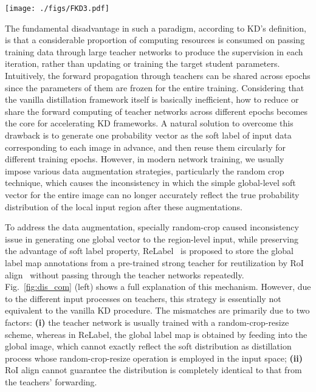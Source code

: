 \documentclass[10pt,twocolumn,letterpaper]{article}
\begin{document}
\begin{figure*}[t]
  \centering
  \texttt{[image: ./figs/FKD3.pdf]}
  \vspace{-0.12in}
  \caption{Comparison of ReLabel~\cite{yun2021re} and our fast knowledge distillation (FKD) framework.} 
  \label{fig:dis_com}
  \vspace{-0.13in}
\end{figure*}

The fundamental disadvantage in such a paradigm, according to KD's definition, is that a considerable proportion of computing resources is consumed on passing training data through large teacher networks to produce the supervision  in each iteration, rather than updating or training the target student parameters. Intuitively, the forward propagation through teachers can be shared across epochs since the parameters of them are frozen for the entire training. Considering that the vanilla distillation framework itself is basically inefficient, how to reduce or share the forward computing of teacher networks across different epochs becomes the core for accelerating  KD frameworks. 
A natural solution to overcome this drawback is to generate one probability vector as the soft label of input data corresponding to each image in advance, and then reuse them circularly for different training epochs. However, in modern network training, we usually impose various data augmentation strategies, particularly the random crop technique, which causes the inconsistency in which the simple global-level soft vector for the entire image can no longer  accurately reflect the true probability distribution of the local input region after these augmentations.

To address the data augmentation, specially random-crop caused inconsistency issue in generating one global vector to the region-level input, while preserving the advantage of soft label property, ReLabel~\cite{yun2021re} is proposed to store the global label map annotations from a pre-trained strong teacher for reutilization by RoI align~\cite{he2017mask} without passing through the teacher networks repeatedly. Fig.~\ref{fig:dis_com} (left) shows a full explanation of this mechanism. However, due to the different input processes on teachers, this strategy is essentially not equivalent to the vanilla KD procedure. The mismatches are primarily due to two factors: {\bf(i)} the teacher network is usually trained with a random-crop-resize scheme, whereas in ReLabel, the global label map is obtained by feeding into the global image, which cannot exactly reflect the soft distribution as distillation process whose random-crop-resize operation is employed in the input space; {\bf(ii)} RoI align cannot guarantee the distribution is completely identical to that from the teachers' forwarding.
\end{document}
